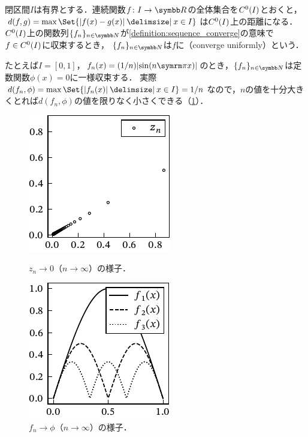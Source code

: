 \documentclass[../../main]{subfiles}
\begin{document}
\begin{example}[一様収束]
  \label{example:uniform_converge}
  閉区間\(I\)は有界とする．連続関数\(f\colon I\to\numset{R}\)の全体集合を\(C^0(I)\)とおくと，\(d(f,g)=\max\Set{\abs{f(x)-g(x)}\given x\in I}\)は\(C^0(I)\)上の距離になる．
  \(C^0(I)\)上の関数列\(\seq{f_n}_{n\in\numset{N}}\)が\cref{definition:sequence_converge}の意味で\(f\in C^0(I)\)に収束するとき，
  \(\seq{f_n}_{n\in\numset{N}}\)は\(f\)に（converge uniformly）という．

  たとえば\(I=[0,1]\)，\(f_n(x)=(1/n)\abs{\sin(n\krez x)}\)のとき，\(\seq{f_n}_{n\in\numset{N}}\)は定数関数\(\phi(x)=0\)に一様収束する．
  実際\(d(f_n,\phi)=\max\Set{\abs{f_n(x)}\given x\in I}=1/n\)なので，\(n\)の値を十分大きくとれば\(d(f_n,\phi)\)の値を限りなく小さくできる（\cref{figure:uniform_converge}）．
\end{example}

\begin{figure}[htbp]
  \begin{minipage}{0.5\linewidth}
    \centering
    \includegraphics{figures/complex_convergence.pdf}
    \caption{\(z_n\to 0\)（\(n\to\infty\)）の様子．}
    \label{figure:sequence_converge}
  \end{minipage}%
  \begin{minipage}{0.5\linewidth}
    \centering
    \includegraphics{figures/func_convergence.pdf}
    \caption{\(f_n\to\phi\)（\(n\to\infty\)）の様子．}
    \label{figure:uniform_converge}
  \end{minipage}
\end{figure}
\end{document}
